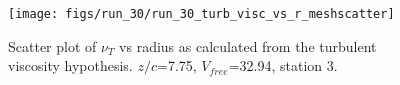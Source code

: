 \begin{figure}[H]
\centering
\texttt{[image: figs/run\_30/run\_30\_turb\_visc\_vs\_r\_meshscatter]}
\caption{Scatter plot of $\nu_T$ vs radius as calculated from the turbulent viscosity hypothesis. $z/c$=7.75, $V_{free}$=32.94, station 3.}
\label{fig:run_30_turb_visc_vs_r_meshscatter}
\end{figure}


